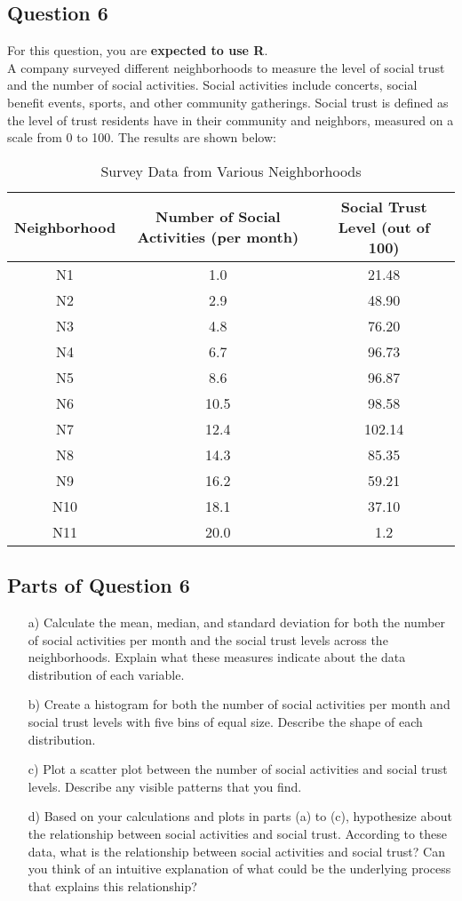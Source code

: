 \documentclass[11pt]{article}
\begin{document}
\subsection*{Question 6}

For this question, you are \textbf{expected to use R}. \\

A company surveyed different neighborhoods to measure the level of social trust and the number of social activities. Social activities include concerts, social benefit events, sports, and other community gatherings. Social trust is defined as the level of trust residents have in their community and neighbors, measured on a scale from 0 to 100. The results are shown below:

\begin{table}[h!]
\centering
\begin{tabular}{|c|c|c|}
\hline
Neighborhood & Number of Social Activities (per month) & Social Trust Level (out of 100) \\
\hline
N1 & 1.0 & 21.48 \\
N2 & 2.9 & 48.90 \\
N3 & 4.8 & 76.20 \\
N4 & 6.7 & 96.73 \\
N5 & 8.6 & 96.87 \\
N6 & 10.5 & 98.58 \\
N7 & 12.4 & 102.14 \\
N8 & 14.3 & 85.35 \\
N9 & 16.2 & 59.21 \\
N10 & 18.1 & 37.10 \\
N11 & 20.0 & 1.2 \\
\hline
\end{tabular}
\caption{Survey Data from Various Neighborhoods}
\end{table}

\subsection*{Parts of Question 6}

\begin{enumerate}
    \item[a)] Calculate the mean, median, and standard deviation for both the number of social activities per month and the social trust levels across the neighborhoods. Explain what these measures indicate about the data distribution of each variable.
    \item[b)] Create a histogram for both the number of social activities per month and social trust levels with five bins of equal size. Describe the shape of each distribution.
    \item[c)] Plot a scatter plot between the number of social activities and social trust levels. Describe any visible patterns that you find.
    \item[d)] Based on your calculations and plots in parts (a) to (c), hypothesize about the relationship between social activities and social trust. According to these data, what is the relationship between social activities and social trust? Can you think of an intuitive explanation of what could be the underlying process that explains this relationship?
\end{enumerate}
\end{document}
